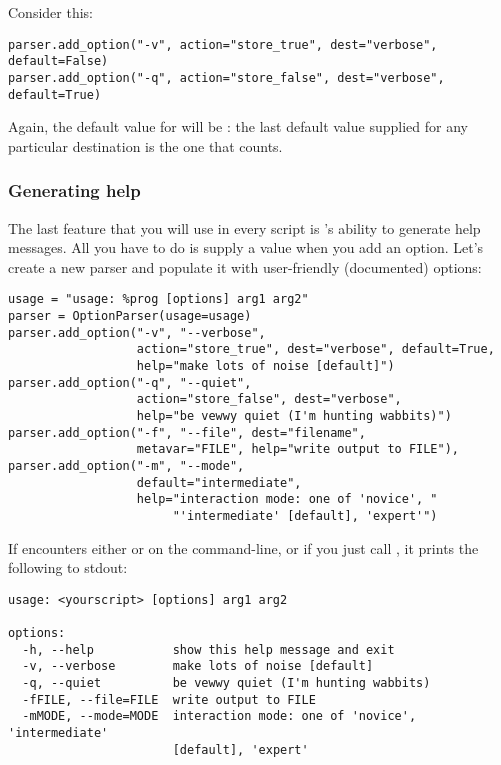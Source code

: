 Consider this:

\begin{verbatim}
parser.add_option("-v", action="store_true", dest="verbose", default=False)
parser.add_option("-q", action="store_false", dest="verbose", default=True)
\end{verbatim}

Again, the default value for  will be : the last
default value supplied for any particular destination is the one that
counts.

\subsubsection{Generating help\label{optparse-generating-help}}

The last feature that you will use in every script is
's ability to generate help messages.  All you have
to do is supply a  value when you add an option.  Let's
create a new parser and populate it with user-friendly (documented)
options:

\begin{verbatim}
usage = "usage: %prog [options] arg1 arg2"
parser = OptionParser(usage=usage)
parser.add_option("-v", "--verbose",
                  action="store_true", dest="verbose", default=True,
                  help="make lots of noise [default]")
parser.add_option("-q", "--quiet",
                  action="store_false", dest="verbose", 
                  help="be vewwy quiet (I'm hunting wabbits)")
parser.add_option("-f", "--file", dest="filename",
                  metavar="FILE", help="write output to FILE"),
parser.add_option("-m", "--mode",
                  default="intermediate",
                  help="interaction mode: one of 'novice', "
                       "'intermediate' [default], 'expert'")
\end{verbatim}

If  encounters either  or
 on the command-line, or if you just call
, it prints the following to stdout:

\begin{verbatim}
usage: <yourscript> [options] arg1 arg2

options:
  -h, --help           show this help message and exit
  -v, --verbose        make lots of noise [default]
  -q, --quiet          be vewwy quiet (I'm hunting wabbits)
  -fFILE, --file=FILE  write output to FILE
  -mMODE, --mode=MODE  interaction mode: one of 'novice', 'intermediate'
                       [default], 'expert'
\end{verbatim}

